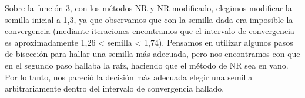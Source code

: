 \documentclass[titlepage,a4paper]{article}
\begin{document}
Sobre la función 3, con los métodos NR y NR modificado, elegimos modificar la semilla inicial a 1,3, ya que observamos que con la semilla dada era imposible la convergencia (mediante iteraciones encontramos que el intervalo de convergencia es aproximadamente 1,26 < semilla < 1,74). Pensamos en utilizar algunos pasos de bisección para hallar una semilla más adecuada, pero nos encontramos con que en el segundo paso hallaba la raíz, haciendo que el método de NR sea en vano. Por lo tanto, nos pareció la decisión más adecuada elegir una semilla arbitrariamente dentro del intervalo de convergencia hallado.
\end{document}
